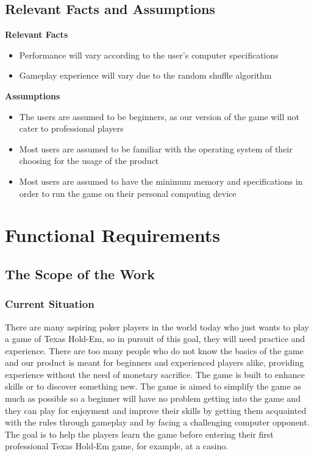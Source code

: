 \documentclass[12pt]{article}
\begin{document}
	\subsection{Relevant Facts and Assumptions}
	\textbf{Relevant Facts}
	\begin{itemize}
	\item	Performance will vary according to the user's computer specifications
	\item 	Gameplay experience will vary due to the random shuffle algorithm
	\end{itemize}
	\textbf{Assumptions}
	\begin{itemize}
	\item 	The users are assumed to be beginners, as our version of the game will not 					cater to professional players 
	\item 	Most users are assumed to be familiar with the operating system of their 					choosing for the usage of the product
	\item 	Most users are assumed to have the minimum memory and specifications in order 				to run the game on their personal computing device
	\end{itemize}

	\section{Functional Requirements}
	\subsection{The Scope of the Work}
	\subsubsection{Current Situation}
	There are many aspiring poker players in the world today who just wants to play a game 		of Texas Hold-Em, so in pursuit of this goal, they will need practice and experience. 	There are too many people who do not know the basics of the game and our product is meant for beginners and experienced players alike, providing experience 		without the need of monetary sacrifice. The game is built to enhance skills or to 			discover something new. The game is aimed to simplify the game as much as possible so 
	a beginner will have no problem getting into the game and they can play for enjoyment and improve their skills by getting them acquainted with the rules through gameplay and by facing a challenging computer opponent. The goal is to help the players learn the game before entering their first professional Texas Hold-Em game, for example, at a casino. 
\end{document}
